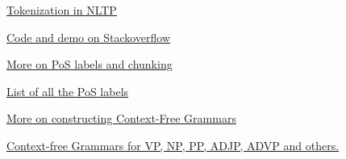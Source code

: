 \documentclass{article}
\begin{document}
\begin{thebibliography}{9}
\href{https://www.guru99.com/tokenize-words-sentences-nltk.html}{Tokenization in NLTP}

\href{https://stackoverflow.com/questions/37605710/tokenize-a-paragraph-into-sentence-and-then-into-words-in-nltk}{Code and demo on Stackoverflow}

\href{https://nickcdryan.com/2017/02/13/shallow-parsing-for-entity-recognition-with-nltk-and-machine-learning/}{More on PoS labels and chunking}

\href{https://medium.com/@gianpaul.r/tokenization-and-parts-of-speech-pos-tagging-in-pythons-nltk-library-2d30f70af13b}{List of all the PoS labels}

\href{http://courses.washington.edu/ling571/ling571_WIN2015/slides/ling571_class2_grammar.pdf}{More on constructing Context-Free Grammars}

\href{https://people.cs.umass.edu/~brenocon/inlp2017/lectures/16-cfg-exercise.pdf}{Context-free Grammars for VP, NP, PP, ADJP, ADVP and others.}
\end{thebibliography}
\end{document}
